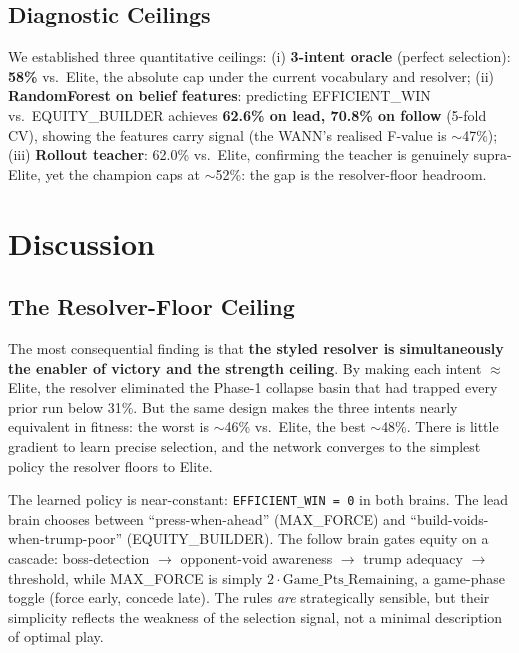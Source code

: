 \documentclass[runningheads]{llncs}
\begin{document}
\subsection{Diagnostic Ceilings}

We established three quantitative ceilings: (i) \textbf{3-intent oracle}
(perfect selection): \textbf{58\%} vs.\ Elite, the absolute cap under the
current vocabulary and resolver; (ii) \textbf{RandomForest on belief features}:
predicting EFFICIENT\_WIN vs.\ EQUITY\_BUILDER achieves \textbf{62.6\% on lead,
70.8\% on follow} (5-fold CV), showing the features carry signal (the WANN's
realised F-value is $\sim$47\%); (iii) \textbf{Rollout teacher}: 62.0\% vs.\
Elite, confirming the teacher is genuinely supra-Elite, yet the champion caps
at $\sim$52\%: the gap is the resolver-floor headroom.

\section{Discussion}
\label{sec:discussion}

\subsection{The Resolver-Floor Ceiling}

The most consequential finding is that \textbf{the styled resolver is
simultaneously the enabler of victory and the strength ceiling}. By making each
intent $\approx$Elite, the resolver eliminated the Phase-1 collapse basin that
had trapped every prior run below 31\%. But the same design makes the three
intents nearly equivalent in fitness: the worst is $\sim$46\% vs.\ Elite, the
best $\sim$48\%. There is little gradient to learn precise selection, and the
network converges to the simplest policy the resolver floors to Elite.

The learned policy is near-constant: \texttt{EFFICIENT\_WIN = 0} in both brains.
The lead brain chooses between ``press-when-ahead'' (MAX\_FORCE) and
``build-voids-when-trump-poor'' (EQUITY\_BUILDER). The follow brain gates
equity on a cascade: boss-detection $\rightarrow$ opponent-void awareness
$\rightarrow$ trump adequacy $\rightarrow$ threshold, while MAX\_FORCE is
simply $2\cdot\text{Game\_Pts\_Remaining}$, a game-phase toggle (force early,
concede late). The rules \emph{are} strategically sensible, but their simplicity
reflects the weakness of the selection signal, not a minimal description of
optimal play.
\end{document}
